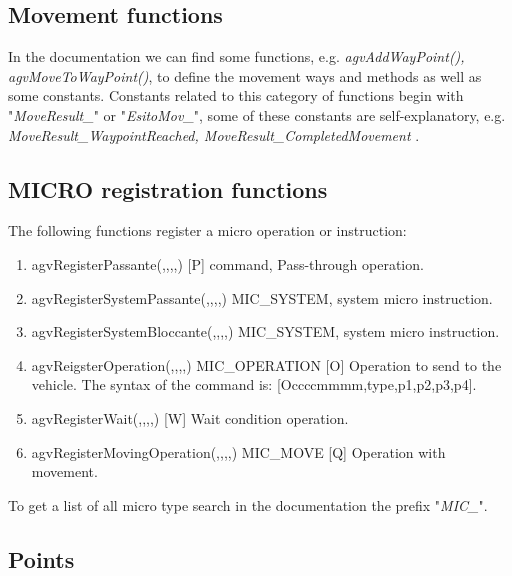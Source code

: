 \subsection{Movement functions}
In the documentation we can find some functions, e.g. \textit{agvAddWayPoint(), agvMoveToWayPoint()}, to define the movement ways and methods as well as some constants. Constants related to this category of functions begin with "\textit{MoveResult\_}" or "\textit{EsitoMov\_}", some of these constants are self-explanatory, e.g. \textit{MoveResult\_WaypointReached, MoveResult\_CompletedMovement }.


\subsection{MICRO registration functions}
The following functions register a micro operation or instruction:\\

\begin{enumerate}
	\item agvRegisterPassante(,,,,) [P] command, Pass-through operation.\\
	
	\item agvRegisterSystemPassante(,,,,) MIC\_SYSTEM, system micro instruction.
	\item agvRegisterSystemBloccante(,,,,) MIC\_SYSTEM, system micro instruction.\\
	
	\item agvReigsterOperation(,,,,) MIC\_OPERATION [O] Operation to send to the vehicle. The syntax of the command is: [Occccmmmm,type,p1,p2,p3,p4].\\
	
	\item agvRegisterWait(,,,,) [W] Wait condition operation.\\
	
	\item agvRegisterMovingOperation(,,,,) MIC\_MOVE [Q] Operation with movement.\\
\end{enumerate}

To get a list of all micro type search in the documentation the prefix "\textit{MIC\_}".

\subsection{Points}

